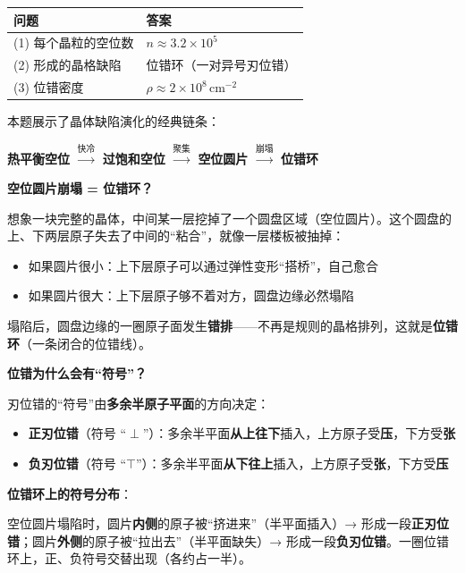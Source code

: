\begin{formulabox}[答案汇总]
\begin{center}
\begin{tabular}{ll}
\toprule
\textbf{问题} & \textbf{答案} \\
\midrule
(1) 每个晶粒的空位数 & $n \approx 3.2\times 10^{5}$ \\
(2) 形成的晶格缺陷 & 位错环（一对异号刃位错） \\
(3) 位错密度 & $\rho \approx 2\times 10^{8}\,\mathrm{cm^{-2}}$ \\
\bottomrule
\end{tabular}
\end{center}
\end{formulabox}

\begin{insightbox}
本题展示了晶体缺陷演化的经典链条：
\begin{center}
\textbf{热平衡空位} $\xrightarrow{\text{快冷}}$ \textbf{过饱和空位} $\xrightarrow{\text{聚集}}$ \textbf{空位圆片} $\xrightarrow{\text{崩塌}}$ \textbf{位错环}
\end{center}

\textbf{空位圆片崩塌 = 位错环？}

想象一块完整的晶体，中间某一层挖掉了一个圆盘区域（空位圆片）。这个圆盘的上、下两层原子失去了中间的``粘合''，就像一层楼板被抽掉：
\begin{itemize}
    \item 如果圆片很小：上下层原子可以通过弹性变形``搭桥''，自己愈合
    \item 如果圆片很大：上下层原子够不着对方，圆盘边缘必然塌陷
\end{itemize}
塌陷后，圆盘边缘的一圈原子面发生\textbf{错排}——不再是规则的晶格排列，这就是\textbf{位错环}（一条闭合的位错线）。

\textbf{位错为什么会有``符号''？}

刃位错的``符号''由\textbf{多余半原子平面}的方向决定：
\begin{itemize}
    \item \textbf{正刃位错}（符号 ``$\perp$''）：多余半平面\textbf{从上往下}插入，上方原子受\textbf{压}，下方受\textbf{张}
    \item \textbf{负刃位错}（符号 ``$\top$''）：多余半平面\textbf{从下往上}插入，上方原子受\textbf{张}，下方受\textbf{压}
\end{itemize}

\textbf{位错环上的符号分布}：

空位圆片塌陷时，圆片\textbf{内侧}的原子被``挤进来''（半平面插入）→ 形成一段\textbf{正刃位错}；圆片\textbf{外侧}的原子被``拉出去''（半平面缺失）→ 形成一段\textbf{负刃位错}。一圈位错环上，正、负符号交替出现（各约占一半）。


\end{insightbox}
